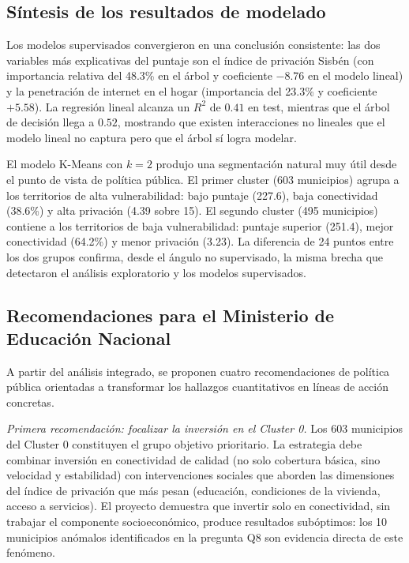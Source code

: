 \subsection{Síntesis de los resultados de modelado}
Los modelos supervisados convergieron en una conclusión consistente: las dos variables más explicativas del puntaje son el índice de privación Sisbén (con importancia relativa del 48.3\% en el árbol y coeficiente $-8.76$ en el modelo lineal) y la penetración de internet en el hogar (importancia del 23.3\% y coeficiente $+5.58$). La regresión lineal alcanza un $R^2$ de $0.41$ en test, mientras que el árbol de decisión llega a $0.52$, mostrando que existen interacciones no lineales que el modelo lineal no captura pero que el árbol sí logra modelar.

El modelo K-Means con $k = 2$ produjo una segmentación natural muy útil desde el punto de vista de política pública. El primer cluster (603 municipios) agrupa a los territorios de alta vulnerabilidad: bajo puntaje (227.6), baja conectividad (38.6\%) y alta privación (4.39 sobre 15). El segundo cluster (495 municipios) contiene a los territorios de baja vulnerabilidad: puntaje superior (251.4), mejor conectividad (64.2\%) y menor privación (3.23). La diferencia de 24 puntos entre los dos grupos confirma, desde el ángulo no supervisado, la misma brecha que detectaron el análisis exploratorio y los modelos supervisados.

\subsection{Recomendaciones para el Ministerio de Educación Nacional}
A partir del análisis integrado, se proponen cuatro recomendaciones de política pública orientadas a transformar los hallazgos cuantitativos en líneas de acción concretas.

\textit{Primera recomendación: focalizar la inversión en el Cluster 0.} Los 603 municipios del Cluster 0 constituyen el grupo objetivo prioritario. La estrategia debe combinar inversión en conectividad de calidad (no solo cobertura básica, sino velocidad y estabilidad) con intervenciones sociales que aborden las dimensiones del índice de privación que más pesan (educación, condiciones de la vivienda, acceso a servicios). El proyecto demuestra que invertir solo en conectividad, sin trabajar el componente socioeconómico, produce resultados subóptimos: los 10 municipios anómalos identificados en la pregunta Q8 son evidencia directa de este fenómeno.

